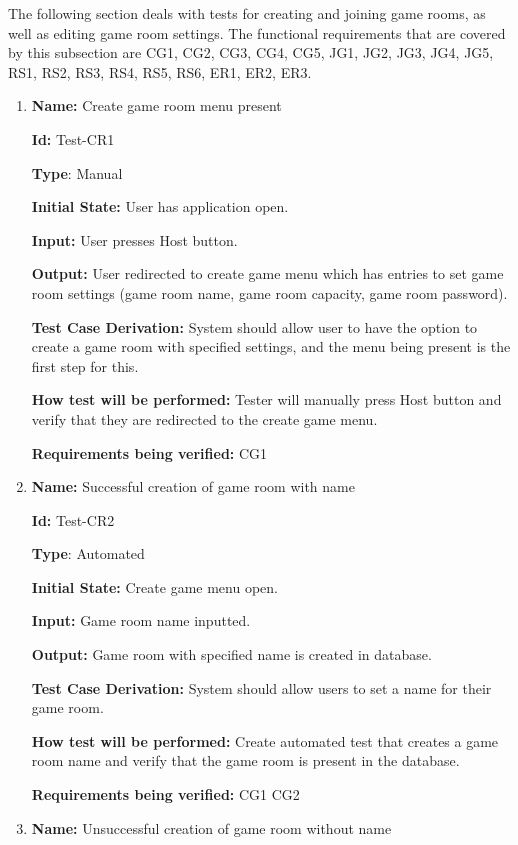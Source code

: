 \documentclass[12pt, titlepage]{article}
\begin{document}
The following section deals with tests for creating and joining game rooms, as well as editing game room settings. The functional requirements that are covered by this subsection are CG1, CG2, CG3, CG4, CG5, JG1, JG2, JG3, JG4, JG5, RS1, RS2, RS3, RS4, RS5, RS6, ER1, ER2, ER3.

\begin{enumerate}

\item{\textbf{Name:} Create game room menu present} 

\textbf{Id:} Test-CR1

\textbf{Type}: Manual

\textbf{Initial State:} User has application open.

\textbf{Input:} User presses Host button.

\textbf{Output:} User redirected to create game menu which has entries to set game room settings (game room name, game room capacity, game room password).

\textbf{Test Case Derivation:} System should allow user to have the option to create a game room with specified settings, and the menu being present is the first step for this.

\textbf{How test will be performed:} Tester will manually press Host button and verify that they are redirected to the create game menu.

\textbf{Requirements being verified:}  CG1

\item{\textbf{Name:} Successful creation of game room with name}

\textbf{Id:} Test-CR2

\textbf{Type}: Automated

\textbf{Initial State:} Create game menu open.

\textbf{Input:} Game room name inputted.

\textbf{Output:} Game room with specified name is created in database.

\textbf{Test Case Derivation:} System should allow users to set a name for their game room.

\textbf{How test will be performed:} Create automated test that creates a game room name and verify that the game room is present in the database.

\textbf{Requirements being verified:} CG1 CG2

\item{\textbf{Name:} Unsuccessful creation of game room without name}


\end{enumerate}
\end{document}

